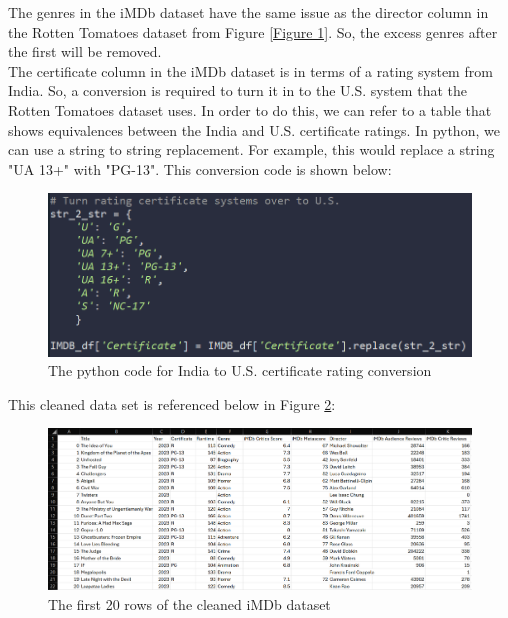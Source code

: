 \documentclass[12pt]{article}
\begin{document}
\noindent The genres in the iMDb dataset have the same issue as the director column in the Rotten Tomatoes dataset from Figure \ref{Figure 1}. So, the excess genres after the first will be removed. \\

\noindent The certificate column in the iMDb dataset is in terms of a rating system from India. So, a conversion is required to turn it in to the U.S. system that the Rotten Tomatoes dataset uses. In order to do this, we can refer to a table that shows equivalences between the India and U.S. certificate ratings. In python, we can use a string to string replacement. For example, this would replace a string "UA 13+" with "PG-13". This conversion code is shown below: \\

\begin{figure}[h]
\begin{center}
      \includegraphics[width=4.5in]{figure4.png}
      \caption{The python code for India to U.S. certificate rating conversion}
      \label{Figure 4}
\end{center}
\end{figure}

\noindent This cleaned data set is referenced below in Figure \ref{Figure 5}: \\

\begin{figure}[h]
\begin{center}
      \includegraphics[width=5in]{figure5.png}
      \caption{The first 20 rows of the cleaned iMDb dataset}
      \label{Figure 5}
\end{center}
\end{figure}
\end{document}
